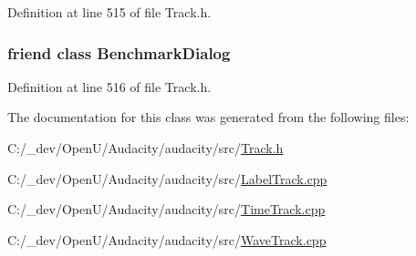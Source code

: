 Definition at line 515 of file Track.\+h.

\subsubsection[{\texorpdfstring{Benchmark\+Dialog}{BenchmarkDialog}}]{\setlength{\rightskip}{0pt plus 5cm}friend class {\bf Benchmark\+Dialog}\hspace{0.3cm}{\ttfamily [friend]}}\hypertarget{class_track_factory_ad14f349c97896b1506b357222f99ff4c}{}\label{class_track_factory_ad14f349c97896b1506b357222f99ff4c}


Definition at line 516 of file Track.\+h.



The documentation for this class was generated from the following files\+:\begin{DoxyCompactItemize}
\item 
C\+:/\+\_\+dev/\+Open\+U/\+Audacity/audacity/src/\hyperlink{src_2track_8h}{Track.\+h}\item 
C\+:/\+\_\+dev/\+Open\+U/\+Audacity/audacity/src/\hyperlink{_label_track_8cpp}{Label\+Track.\+cpp}\item 
C\+:/\+\_\+dev/\+Open\+U/\+Audacity/audacity/src/\hyperlink{_time_track_8cpp}{Time\+Track.\+cpp}\item 
C\+:/\+\_\+dev/\+Open\+U/\+Audacity/audacity/src/\hyperlink{_wave_track_8cpp}{Wave\+Track.\+cpp}\end{DoxyCompactItemize}
